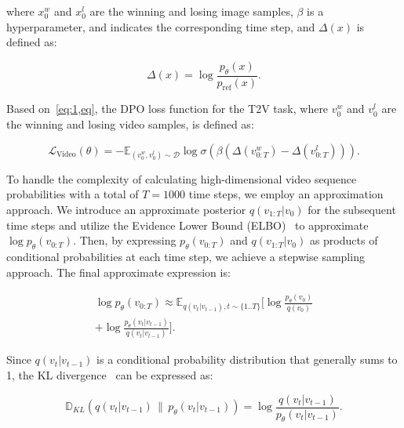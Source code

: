 where \(x_0^w\) and \(x_0^l\) are the winning and losing image samples, \(\beta\) is a hyperparameter, and  indicates the corresponding time step, and \(\Delta(x)\) is defined as:

\begin{equation}
\label{eq}
\Delta(x) = \log \frac{p_\theta(x)}{p_{\text{ref}}(x)}.
\end{equation}


Based on~\cref{eq:1,eq}, the DPO loss function for the T2V task, where \( v_0^w \) and \( v_0^l \) are the winning and losing video samples, is defined as:

\begin{equation}
\label{eq:3}
\mathcal{L}_{\text{Video}}(\theta) = -\mathbb{E}_{(v_0^w, v_0^l) \sim \mathcal{D}} \log \sigma \left( \beta \left( \Delta(v_{0:T}^w) - \Delta(v_{0:T}^l) \right) \right).
\end{equation}


To handle the complexity of calculating high-dimensional video sequence probabilities with a total of \( T = 1000 \) time steps, we employ an approximation approach. We introduce an approximate posterior \( q(v_{1:T} | v_0) \) for the subsequent time steps and utilize the Evidence Lower Bound (ELBO)~\cite{kingma2013auto,hoffman2013stochastic} to approximate $\log p_\theta(v_{0:T})$. Then, by expressing \( p_\theta(v_{0:T}) \) and \( q(v_{1:T} | v_0) \) as products of conditional probabilities at each time step, we achieve a stepwise sampling approach. The final approximate expression is:

\begin{equation}
\label{KL1}
\begin{split}
\log p_\theta(v_{0:T}) \approx \mathbb{E}_{q(v_t | v_{t-1}), t \sim \{1..T\}} 
\Bigg[ \log \frac{p_\theta(v_0)}{q(v_0)} \\
+ \log \frac{p_\theta(v_t | v_{t-1})}{q(v_t | v_{t-1})} \Bigg].
\end{split}
\end{equation}


Since \( q(v_t | v_{t-1}) \) is a conditional probability distribution that generally sums to 1, the KL divergence~\cite{kingma2013auto,blei2017variational} can be expressed as:

\begin{equation}
\label{KL2}
\mathbb{D}_{KL}\left( q(v_t | v_{t-1}) \, \| \, p_\theta(v_t | v_{t-1}) \right) =  \log \frac{q(v_t | v_{t-1})}{p_\theta(v_t | v_{t-1})}.
\end{equation}


